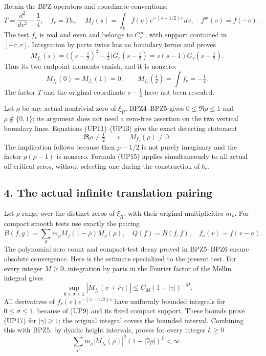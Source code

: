 \documentclass[
  10pt,
  a4paper,
]{article}
\begin{document}
Retain the BPZ operators and coordinate conventions: \[
T=\frac{d^2}{dv^2}-\frac14,\quad f_r=T b_r,\quad
M_f(s)=\int_{\mathbb R}f(v)e^{-(s-1/2)v}\,dv,\quad
f^\#(v)=\overline{f(-v)}.
\tag{UP12}
\] The test \(f_r\) is real and even and belongs to \(C_c^\infty\), with
support contained in \([-r,r]\). Integration by parts twice has no
boundary terms and proves \[
M_{f_r}(s)
=\bigl((s-\tfrac12)^2-\tfrac14\bigr)G_r(s-\tfrac12)
=s(s-1)G_r(s-\tfrac12).
\tag{UP13}
\] Thus its two endpoint moments vanish, and it is nonzero: \[
M_{f_r}(0)=M_{f_r}(1)=0,
\qquad M_{f_r}(\tfrac12)=\int f_r=-\tfrac14.
\tag{UP14}
\] The factor \(T\) and the original coordinate \(s-\tfrac12\) have not
been rescaled.

Let \(\rho\) be any actual nontrivial zero of \(\xi_R\). BPZ4--BPZ5
gives \(0\le\Re\rho\le1\) and \(\rho\notin\{0,1\}\); its argument does
not need a zero-free assertion on the two vertical boundary lines.
Equations (UP11)--(UP13) give the exact detecting statement \[
\Re\rho\ne\tfrac12\quad\Longrightarrow\quad M_{f_r}(\rho)\ne0.
\tag{UP15}
\] The implication follows because then \(\rho-1/2\) is not purely
imaginary and the factor \(\rho(\rho-1)\) is nonzero. Formula (UP15)
applies simultaneously to all actual off-critical zeros, without
selecting one during the construction of \(b_r\).

\subsection{4. The actual infinite translation
pairing}\label{the-actual-infinite-translation-pairing}

Let \(\rho\) range over the distinct zeros of \(\xi_R\), with their
original multiplicities \(m_\rho\). For compact smooth tests use exactly
the pairing \[
B(f,g)=\sum_\rho m_\rho\overline{M_f(1-\bar\rho)}M_g(\rho),
\quad Q(f)=B(f,f),\quad f_a(v)=f(v-a).
\tag{UP16}
\] The polynomial zero count and compact-test decay proved in BPZ5--BPZ6
ensure absolute convergence. Here is the estimate specialized to the
present test. For every integer \(M\ge0\), integration by parts in the
Fourier factor of the Mellin integral gives \[
\sup_{0\le\sigma\le1}|M_{f_r}(\sigma+i\gamma)|
\le C_M(1+|\gamma|)^{-M}.
\tag{UP17}
\] All derivatives of \(f_r(v)e^{-(\sigma-1/2)v}\) have uniformly
bounded integrals for \(0\le\sigma\le1\), because of (UP9) and its fixed
compact support. These bounds prove (UP17) for \(|\gamma|\ge1\); the
original integral covers the bounded interval. Combining this with BPZ5,
by dyadic height intervals, proves for every integer \(k\ge0\) \[
\sum_\rho m_\rho|M_{f_r}(\rho)|^2(1+|\Im\rho|)^k<\infty.
\tag{UP18}
\]
\end{document}
